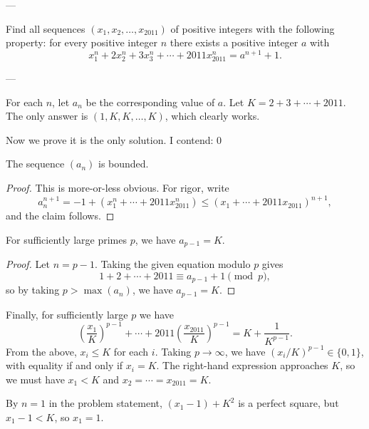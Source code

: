 
---

Find all sequences $(x_1,x_2,\ldots,x_{2011})$ of positive integers with the following property: for every positive integer $n$ there exists a positive integer $a$ with \[x_1^n+2x_2^n+3x_3^n+\cdots+2011x_{2011}^n=a^{n+1}+1.\]

---

For each $n$, let $a_n$ be the corresponding value of $a$. Let $K=2+3+\cdots+2011$. The only answer is $(1,K,K,\ldots,K)$, which clearly works.

Now we prove it is the only solution. I contend:
\setcounter{claim}0
\begin{claim}
    The sequence $(a_n)$ is bounded.
\end{claim}
\begin{proof}
    This is more-or-less obvious. For rigor, write \[a_n^{n+1}=-1+\left(x_1^n+\cdots+2011x_{2011}^n\right)\le\left(x_1+\cdots+2011x_{2011}\right)^{n+1},\]
    and the claim follows.
\end{proof}
\begin{claim}
    For sufficiently large primes $p$, we have $a_{p-1}=K$.
\end{claim}
\begin{proof}
    Let $n=p-1$. Taking the given equation modulo $p$ gives \[1+2+\cdots+2011\equiv a_{p-1}+1\pmod p,\]
    so by taking $p>\max(a_n)$, we have $a_{p-1}=K$.
\end{proof}

Finally, for sufficiently large $p$ we have \[\left(\frac{x_1}K\right)^{p-1}+\cdots+2011\left(\frac{x_{2011}}K\right)^{p-1}=K+\frac1{K^{p-1}}.\]
From the above, $x_i\le K$ for each $i$. Taking $p\to\infty$, we have $(x_i/K)^{p-1}\in\{0,1\}$, with equality if and only if $x_i=K$. The right-hand expression approaches $K$, so we must have $x_1<K$ and $x_2=\cdots=x_{2011}=K$.

By $n=1$ in the problem statement, $(x_1-1)+K^2$ is a perfect square, but $x_1-1<K$, so $x_1=1$.


